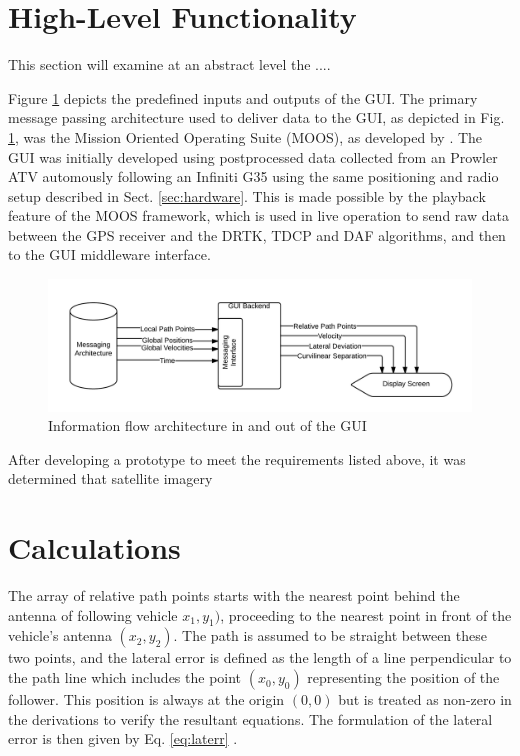 \documentclass[12pt]{report}
\begin{document}
\section{High-Level Functionality}
\label{sec:arch}
This section will examine at an abstract level the ....

Figure \ref{fig:blackboxflow} depicts the predefined inputs and outputs of the GUI. The primary message passing architecture used to deliver data to the GUI, as depicted in Fig. \ref{fig:blackboxflow}, was the Mission Oriented Operating Suite (MOOS), as developed by \cite{moos}. The GUI was initially developed using postprocessed data collected from an Prowler ATV automously following an Infiniti G35 using the same positioning and radio setup described in Sect. \ref{sec:hardware}. This is made possible by the playback feature of the MOOS framework, which is used in live operation to send raw data between the GPS receiver and the DRTK, TDCP and DAF algorithms, and then to the GUI middleware interface.


\begin{figure}[ht]
    \centering
    \includegraphics[width=6.5in]{./figs/blackbox_flowchart.png}
    \caption{Information flow architecture in and out of the GUI}
    \label{fig:blackboxflow}
\end{figure}

After developing a prototype to meet the requirements listed above, it was determined that satellite imagery


\section{Calculations}
\label{sec:guicalc}


The array of relative path points starts with the nearest point behind the antenna of following vehicle $x_1,y_1)$, proceeding to the nearest point in front of the vehicle's antenna $(x_2,y_2)$. The path is assumed to be straight between these two points, and the lateral error is defined as the length of a line perpendicular to the path line which includes the point $(x_0,y_0)$ representing the position of the follower. This position is always at the origin $(0,0)$ but is treated as non-zero in the derivations to verify the resultant equations. The formulation of the lateral error is then given by Eq. \ref{eq:laterr} \cite{laterrformula}.
\end{document}
